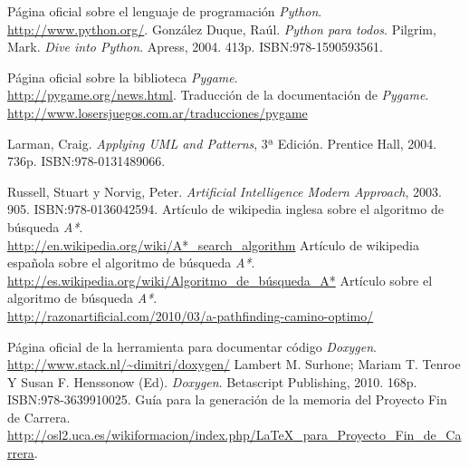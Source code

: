 

\begin{thebibliography}{99}
Página oficial sobre el lenguaje de programación \emph{Python}.\\ \url{http://www.python.org/}.
González Duque, Raúl. \emph{Python para todos}.
Pilgrim, Mark. \emph{Dive into Python}. Apress, 2004. 413p. ISBN:978-1590593561.

Página oficial sobre la biblioteca \emph{Pygame}.\\ \url{http://pygame.org/news.html}.
Traducción de la documentación de \emph{Pygame}.\\ \url{http://www.losersjuegos.com.ar/traducciones/pygame}

Larman, Craig. \emph{Applying UML and Patterns}, 3ª Edición. Prentice Hall, 2004. 736p. ISBN:978-0131489066.

Russell, Stuart y Norvig, Peter. \emph{Artificial Intelligence Modern Approach}, 2003. 905. ISBN:978-0136042594.
Artículo de wikipedia inglesa sobre el algoritmo de búsqueda \emph{A*}.\\ \url{http://en.wikipedia.org/wiki/A*_search_algorithm}
Artículo de wikipedia española sobre el algoritmo de búsqueda \emph{A*}.\\ \url{http://es.wikipedia.org/wiki/Algoritmo_de_búsqueda_A*}
Artículo sobre el algoritmo de búsqueda \emph{A*}.\\ \url{http://razonartificial.com/2010/03/a-pathfinding-camino-optimo/}

Página oficial de la herramienta para documentar código \emph{Doxygen}.\\ \url{http://www.stack.nl/~dimitri/doxygen/}
Lambert M. Surhone; Mariam T. Tenroe Y Susan F. Henssonow (Ed). \emph{Doxygen}. Betascript Publishing, 2010. 168p. ISBN:978-3639910025.  
Guía para la generación de la memoria del Proyecto Fin de Carrera.\\ \url{http://osl2.uca.es/wikiformacion/index.php/LaTeX_para_Proyecto_Fin_de_Carrera}.


\end{thebibliography}
